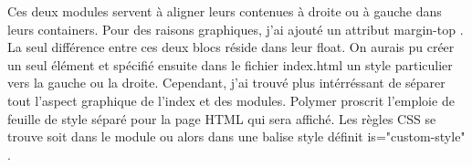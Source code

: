 \documentclass{article}
\begin{document}
Ces deux modules servent \`a aligner leurs contenues \`a droite ou \`a gauche dans leurs containers. Pour des raisons graphiques, j'ai ajout\'e un attribut \og margin-top \fg{}. La seul diff\'erence entre ces deux blocs r\'eside dans leur float. On aurais pu cr\'eer un seul \'el\'ement et sp\'ecifi\'e ensuite dans le fichier index.html un style particulier vers la gauche ou la droite. Cependant, j'ai trouv\'e plus int\'err\'essant de s\'eparer tout l'aspect graphique de l'index et des modules. Polymer proscrit l'emploie de feuille de style s\'epar\'e pour la page HTML qui sera affich\'e. Les r\`egles CSS se trouve soit dans le module ou alors dans une balise style d\'efinit \og is="custom-style" \fg{}.  
\vspace{0.5cm}\\
\end{document}
